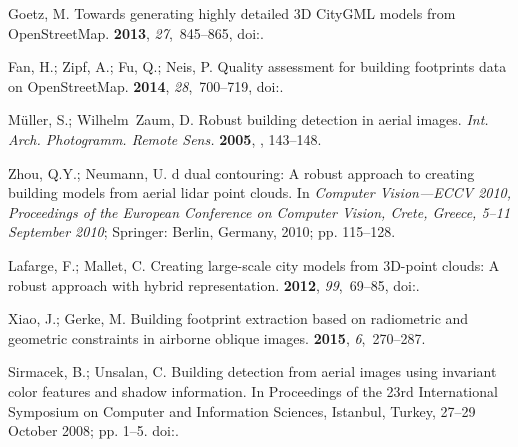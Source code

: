 \documentclass[remotesensing,article,accept,moreauthors,pdftex,10pt,a4paper]{mdpi}
\theoremstyle{mdpi}
\newcounter{ex}
\newcounter{re}
\begin{document}
%
\begin{thebibliography}{999}
\providecommand{\natexlab}[1]{#1}

Goetz, M.
\newblock Towards generating highly detailed 3D CityGML models from
  OpenStreetMap.
 {\bf
  2013}, {\em 27},~845--865,
\newblock
  doi:{\href{https://doi.org/10.1080/13658816.2012.721552}{}}.

Fan, H.; Zipf, A.; Fu, Q.; Neis, P.
\newblock Quality assessment for building footprints data on OpenStreetMap.
 {\bf
  2014}, {\em 28},~700--719,
\newblock
  doi:{\href{https://doi.org/10.1080/13658816.2013.867495}{}}.

M{\"u}ller, S.; Wilhelm~Zaum, D.
\newblock Robust building detection in aerial images. \emph{Int. Arch. Photogramm. Remote Sens.} {\bf 2005},
, 143--148.

Zhou, Q.Y.; Neumann, U.
 d dual contouring: A robust approach to creating building models
  from aerial lidar point clouds.
\newblock In \emph{Computer Vision---ECCV 2010, Proceedings of the European Conference on Computer Vision, Crete, Greece, 5--11 September 2010}; Springer: Berlin, Germany, 2010; pp. 115--128.

Lafarge, F.; Mallet, C.
\newblock Creating large-scale city models from 3D-point clouds: A robust
  approach with hybrid representation.
 {\bf 2012}, {\em
  99},~69--85,
\newblock
  doi:{\href{https://doi.org/10.1007/s11263-012-0517-8}{}}.

Xiao, J.; Gerke, M.
\newblock Building footprint extraction based on radiometric and geometric
  constraints in airborne oblique images.
 {\bf 2015}, {\em
  6},~270--287.

Sirmacek, B.; Unsalan, C.
\newblock Building detection from aerial images using invariant color features
  and shadow information.
\newblock  In Proceedings of the 23rd International Symposium on Computer and Information
  Sciences, Istanbul, Turkey, 27--29 October 2008; pp. 1--5.
\newblock
  doi:{\href{https://doi.org/10.1109/ISCIS.2008.4717854}{}}.


\end{thebibliography}
\end{document}

